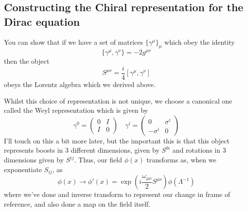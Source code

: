 \subsection{Constructing the Chiral representation for the Dirac equation}
You can show that if we have a set of matrices $\{ \gamma^\mu \}_\mu$ which obey the identity 
\[ \{ \gamma^\mu , \gamma^\nu \} =  - 2 g^{\mu\nu}  \] then the object 
\[ S^{ \mu \nu } = \frac{i}{4} [\gamma^\mu, \gamma^\nu] \] obeys the Lorentz algebra which we derived above.  

Whilst this choice of representation is not unique, we choose a canonical one called the Weyl representation which is given by
\[ \gamma^0 = \begin{pmatrix} 0  & I \\ I & 0 \end{pmatrix} \quad \gamma^i = \begin{pmatrix} 0 & \sigma^{i} \\ - \sigma^i & 0 \end{pmatrix} \]  
I'll touch on this a bit more later, but the important this is that this object represents boosts in 3 different dimensions, given by $S^{0i}$ and rotations in 3 dimensions given by $S^{ij}$. 
Thus, our field $\phi(x)$ transforms as, when we exponentiate $S_{ij}$, as \[ \phi(x) \rightarrow \phi'(x) = \exp(i \frac{\omega_{\mu\nu}}{2} S^{\mu\nu}) \phi(\Lambda^{-1}) \] where we've done and inverse transform to represent our change in frame of reference, and also done a map on the field itself.  

